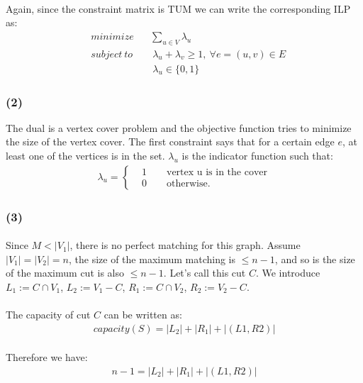 \paragraph{}
Again, since the constraint matrix is TUM we can write the corresponding ILP as:
\begin{align*}
& minimize \quad \ \ \ \sum_{u\in V} \lambda_u\\
& subject \ to \qquad \lambda_u + \lambda_v \geq 1, \ \forall e=(u, v) \in E\\
&\qquad \qquad \quad \quad \ \lambda_u \in \{0, 1\}
\end{align*}
\subsubsection*{(2)} 
The dual is a vertex cover problem and the objective function tries to minimize the size of the vertex cover. The first constraint says that for a certain edge $e$, at least one of the vertices is in the set. $\lambda_u$ is the indicator function such that:
\begin{align*}
\lambda_u = \begin{cases}
&1 \qquad \text{vertex u is in the cover}\\
&0 \qquad \text{otherwise}.
\end{cases}
\end{align*}
\subsubsection*{(3)} 
\paragraph{}
Since $M<|V_1|$, there is no perfect matching for this graph. Assume $|V_1|=|V_2|=n$, the size of the maximum matching is $\leq n-1$, and so is the size of the maximum cut is also $\leq n-1$. Let's call this cut $C$. We introduce $L_1:=C \cap V_1$, $L_2:= V_1 - C$, $R_1:=C \cap V_2$, $R_2:= V_2 - C$.
\paragraph{}
The capacity of cut $C$ can be written as:
\begin{align*}
capacity(S) = |L_2| + |R_1| +|(L1, R2)|
\end{align*}
\paragraph{}
Therefore we have:
\begin{align*}
n-1 = |L_2| + |R_1| +|(L1, R2)|
\end{align*}
